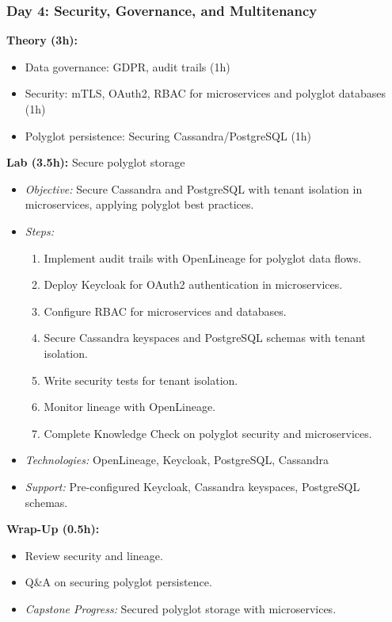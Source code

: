 \documentclass[11pt]{article}
\begin{document}
\subsubsection{Day 4: Security, Governance, and Multitenancy}
\textbf{Theory (3h):}
\begin{itemize}
    \item Data governance: GDPR, audit trails (1h)
    \item Security: mTLS, OAuth2, RBAC for microservices and polyglot databases (1h)
    \item Polyglot persistence: Securing Cassandra/PostgreSQL (1h)
\end{itemize}
\textbf{Lab (3.5h):} Secure polyglot storage
\begin{itemize}
    \item \textit{Objective:} Secure Cassandra and PostgreSQL with tenant isolation in microservices, applying polyglot best practices.
    \item \textit{Steps:}
        \begin{enumerate}
            \item Implement audit trails with OpenLineage for polyglot data flows.
            \item Deploy Keycloak for OAuth2 authentication in microservices.
            \item Configure RBAC for microservices and databases.
            \item Secure Cassandra keyspaces and PostgreSQL schemas with tenant isolation.
            \item Write security tests for tenant isolation.
            \item Monitor lineage with OpenLineage.
            \item Complete Knowledge Check on polyglot security and microservices.
        \end{enumerate}
    \item \textit{Technologies:} OpenLineage, Keycloak, PostgreSQL, Cassandra
    \item \textit{Support:} Pre-configured Keycloak, Cassandra keyspaces, PostgreSQL schemas.
\end{itemize}
\textbf{Wrap-Up (0.5h):}
\begin{itemize}
    \item Review security and lineage.
    \item Q\&A on securing polyglot persistence.
    \item \textit{Capstone Progress:} Secured polyglot storage with microservices.
\end{itemize}
\end{document}
